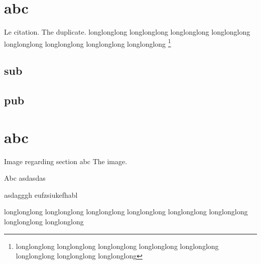 \documentclass[first=firstname,last=lastname,company=comp,location=Dresden]{baarticle}
\begin{document}
\section{abc}
Le citation.
The duplicate.
longlonglong longlonglong longlonglong longlonglong longlonglong longlonglong longlonglong longlonglong
\footnote{longlonglong longlonglong longlonglong longlonglong longlonglong longlonglong longlonglong longlonglong}
\subsection{sub}
\subsection{pub}
\section{abc}
\begin{bafigure}{Image regarding section abc}
    The image.
\end{bafigure}
\clearpage
\begin{baappx}
    \begin{bafigure}{Abc}
        asdasdas
    \end{bafigure}
    asdagggh
    eufzsiukefhabl
\end{baappx}
\clearpage
\printbibliography[heading=bibintoc]
longlonglong longlonglong longlonglong longlonglong longlonglong longlonglong longlonglong longlonglong
\clearpage
{}
\end{document}
